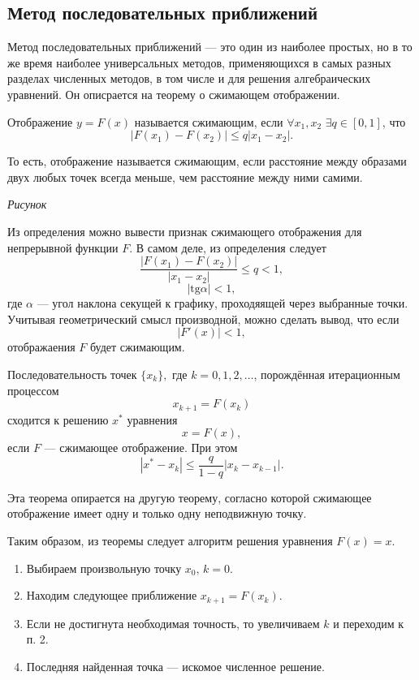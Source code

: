 \subsection{Метод последовательных приближений}

Метод последовательных приближений — это один из наиболее простых,
но в то же время наиболее универсальных методов, применяющихся в самых
разных разделах численных методов, в том числе и для решения алгебраических
уравнений. Он описрается на теорему о сжимающем отображении.
\begin{defn}
Отображение $y=F(x)$ называется сжимающим, если $\forall x_{1},x_{2}$
$\exists q\in[0,1]$, что
\[
|F(x_{1})-F(x_{2})|\leqslant q|x_{1}-x_{2}|.
\]

\end{defn}
То есть, отображение называется сжимающим, если расстояние между образами
двух любых точек всегда меньше, чем расстояние между ними самими.

\emph{Рисунок}

Из определения можно вывести признак сжимающего отображения для непрерывной
функции $F$. В самом деле, из определения следует
\[
\frac{|F(x_{1})-F(x_{2})|}{|x_{1}-x_{2}|}\leqslant q<1,
\]
\[
|\mathrm{tg}\alpha|<1,
\]
где $\alpha$ — угол наклона секущей к графику, проходяящей через
выбранные точки. Учитывая геометрический смысл производной, можно
сделать вывод, что если
\[
|F'(x)|<1,
\]
отображаения $F$ будет сжимающим.
\begin{thm}
Последовательность точек $\{x_{k}\},$ где $k=0,1,2,\dots$, порождённая
итерационным процессом 
\[
x_{k+1}=F(x_{k})
\]
 сходится к решению $x^{*}$ уравнения 
\[
x=F(x),
\]
если $F$ — сжимающее отображение. При этом
\[
|x^{*}-x_{k}|\leqslant\frac{q}{1-q}|x_{k}-x_{k-1}|.
\]

\end{thm}
Эта теорема опирается на другую теорему, согласно которой сжимающее
отображение имеет одну и только одну неподвижную точку.

Таким образом, из теоремы следует алгоритм решения уравнения $F(x)=x$. 
\begin{enumerate}
\item Выбираем произвольную точку $x_{0},\, k=0$.
\item Находим следующее приближение $x_{k+1}=F(x_{k})$.
\item Если не достигнута необходимая точность, то увеличиваем $k$ и переходим
к п. 2.
\item Последняя найденная точка — искомое численное решение.
\end{enumerate}

